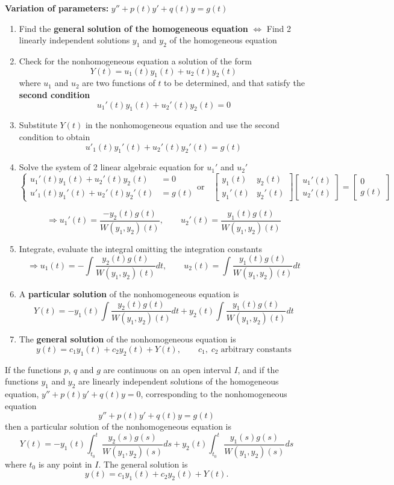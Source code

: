 {\bf Variation of parameters: }
$y''+p(t)y'+q(t)y=g(t)$
\begin{enumerate}
\item Find the {\bf general solution of the homogeneous
equation} $\Leftrightarrow$ Find 2 linearly independent solutions
$y_1$ and $y_2$ of the homogeneous equation
\item Check for the nonhomogeneous equation a solution of the form
$$Y(t)=u_1(t)y_1(t)+u_2(t)y_2(t)$$
where $u_1$ and $u_2$ are two functions of $t$ to be determined, and
that satisfy the {\bf second condition}
$$u_1'(t)y_1(t)+u_2'(t)y_2(t)=0$$
\item Substitute $Y(t)$ in the nonhomogeneous equation and use the
second condition to obtain
$$u'_1(t)y_1'(t)+u_2'(t)y_2'(t)=g(t)$$
\item Solve  the system of 2 linear algebraic
equation for $u_1'$ and $u_2'$
$$\left \{
\begin{array}{ll}
u_1'(t)y_1(t)+u_2'(t)y_2(t)&=0\\
u'_1(t)y_1'(t)+u_2'(t)y_2'(t)&=g(t)
\end{array}\right . \mathrm{or} \quad
\left [
\begin{array}{ll}
y_1(t)&y_2(t)\\
y_1'(t)&y_2'(t)
\end{array}\right ]\left [
\begin{array}{l}
u_1'(t)\\
u_2'(t)
\end{array}\right ]=\left [
\begin{array}{l}
0\\
g(t)
\end{array}\right ]
$$

$$\Rightarrow u_1'(t)=\frac{-y_2(t)g(t)}{W(y_1,y_2)(t)}, \qquad u_2'(t)=\frac{y_1(t)g(t)}{W(y_1,y_2)(t)}$$
\item Integrate, evaluate the integral omitting the integration
constants
$$\Rightarrow u_1(t)=-\int \frac{y_2(t)g(t)}{W(y_1,y_2)(t)}dt, \qquad u_2(t)=\int \frac{y_1(t)g(t)}{W(y_1,y_2)(t)}dt$$
\item A {\bf particular solution} of the nonhomogeneous equation is
$$Y(t)=-y_1(t)\int \frac{y_2(t)g(t)}{W(y_1,y_2)(t)}dt + y_2(t)\int \frac{y_1(t)g(t)}{W(y_1,y_2)(t)}dt$$
\item The {\bf general solution} of the nonhomogeneous equation is
$$y(t)=c_1y_1(t)+c_2y_2(t)+Y(t), \qquad c_1, \; c_2 \; \textrm{arbitrary constants}$$
\end{enumerate}


\begin{theorem}
If the functions $p$, $q$ and $g$ are continuous on an open interval
$I$, and if the functions $y_1$ and $y_2$ are linearly independent
solutions of the homogeneous equation, $y''+p(t)y'+q(t)y=0$,
corresponding to the nonhomogeneous equation
$$y''+p(t)y'+q(t)y=g(t)$$
then a particular solution of the nonhomogeneous equation is
$$Y(t)=-y_1(t)\int_{t_0}^t \frac{y_2(s)g(s)}{W(y_1,y_2)(s)}ds+y_2(t)\int_{t_0}^t \frac{y_1(s)g(s)}{W(y_1,y_2)(s)}ds$$
where $t_0$ is any point in $I$. The general solution is
$$y(t)=c_1y_1(t)+c_2y_2(t)+Y(t).$$
\end{theorem}

